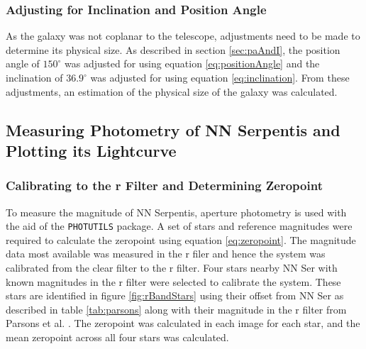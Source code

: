 \documentclass[%
reprint,
amsmath,amssymb,
aps,
]{revtex4-2}
\begin{document}
			\subsubsection{Adjusting for Inclination and Position Angle}
				As the galaxy was not coplanar to the telescope, adjustments need to be made to determine its physical size. As described in section \ref{sec:paAndI}, the position angle of $150^\circ$ was adjusted for using equation \ref{eq:positionAngle} and the inclination of $36.9^\circ$ was adjusted for using equation \ref{eq:inclination}. From these adjustments, an estimation of the physical size of the galaxy was calculated.
		
		\subsection{Measuring Photometry of NN Serpentis and Plotting its Lightcurve}
			
			\subsubsection{Calibrating to the r Filter and Determining Zeropoint}
				To measure the magnitude of NN Serpentis, aperture photometry is used with the aid of the \texttt{PHOTUTILS} package. A set of stars and reference magnitudes were required to calculate the zeropoint using equation \ref{eq:zeropoint}. The magnitude data most available was measured in the r filer and hence the system was calibrated from the clear filter to the r filter. Four stars nearby NN Ser with known magnitudes in the r filter were selected to calibrate the system. These stars are identified in figure \ref{fig:rBandStars} using their offset from NN Ser as described in table \ref{tab:parsons} along with their magnitude in the r filter from Parsons et al. \cite{parsons}. The zeropoint was calculated in each image for each star, and the mean zeropoint across all four stars was calculated.
			
\end{document}
